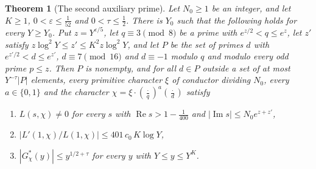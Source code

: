 \documentclass[11pt,letterpaper]{article}
\newtheorem{theorem}{Theorem}[section]
\numberwithin{equation}{section}
\begin{document}
\begin{theorem}[The second auxiliary prime]\label{stage2}
Let $N_0\ge1$ be an integer, and let $K\ge1$, $0<\varepsilon\le\tfrac1{52}$ and $0<\tau\le\tfrac12$. There is $Y_0$ such that the following holds for every $Y\ge Y_0$. Put $z=Y^{\varepsilon/5}$, let $q\equiv3\pmod8$ be a prime with $e^{z/2}<q\le e^z$, let $z'$ satisfy $z\log^2Y\le z'\le K^2z\log^2Y$, and let $P$ be the set of primes $d$ with $e^{z'/2}<d\le e^{z'}$, $d\equiv7\pmod{16}$ and $d\equiv-1$ modulo $q$ and modulo every odd prime $p\le z$. Then $P$ is nonempty, and for all $d\in P$ outside a set of at most $Y^{-\tau}|P|$ elements, every primitive character $\xi$ of conductor dividing $N_0$, every $a\in\{0,1\}$ and the character $\chi=\xi\cdot(\tfrac{\cdot}{q})^a(\tfrac{\cdot}{d})$ satisfy
\begin{enumerate}
\item[(i)] $L(s,\chi)\ne0$ for every $s$ with $\operatorname{Re}s>1-\tfrac1{400}$ and $|\operatorname{Im}s|\le N_0e^{z+z'}$,
\item[(ii)] $|L'(1,\chi)/L(1,\chi)|\le401\,c_0\,K\log Y$,
\item[(iii)] $|G^\ast_\chi(y)|\le y^{1/2+\tau}$ for every $y$ with $Y\le y\le Y^K$.
\end{enumerate}
\end{theorem}
\end{document}
